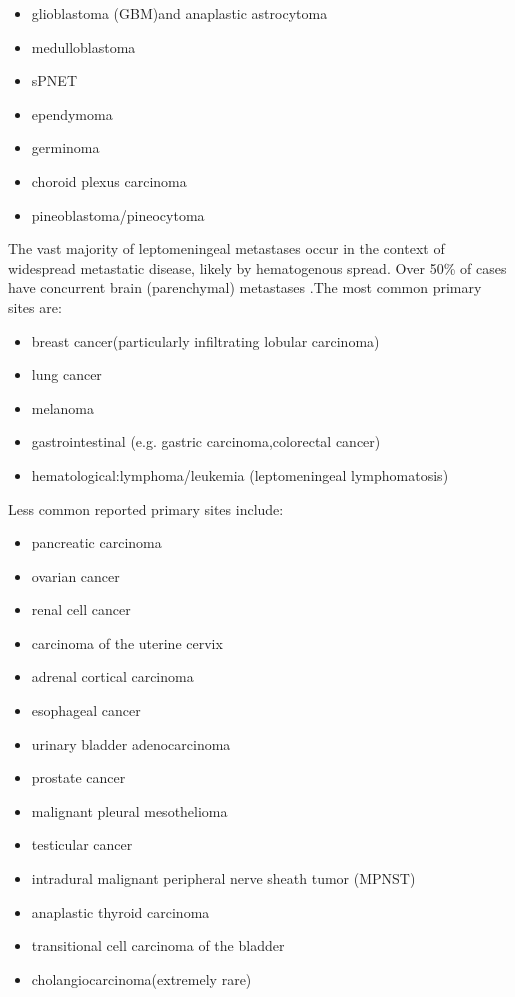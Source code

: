 \begin{itemize}
	\item
	glioblastoma (GBM)and anaplastic astrocytoma
	\item
	medulloblastoma
	\item
	sPNET
	\item
	ependymoma
	\item
	germinoma
	\item
	choroid plexus carcinoma
	\item
	pineoblastoma/pineocytoma 
\end{itemize}

The vast majority of leptomeningeal metastases occur in the context of widespread metastatic disease, likely by hematogenous spread. Over 50\% of cases have concurrent brain (parenchymal) metastases .The most common primary sites are:

\begin{itemize}
	\item
	breast cancer(particularly infiltrating lobular carcinoma)
	\item
	lung cancer
	\item
	melanoma
	\item
	gastrointestinal (e.g. gastric carcinoma,colorectal cancer)
	\item
	hematological:lymphoma/leukemia (leptomeningeal lymphomatosis)
\end{itemize}

Less common reported primary sites include:

\begin{itemize}
	\item
	pancreatic carcinoma 
	\item
	ovarian cancer 
	\item
	renal cell cancer 
	\item
	carcinoma of the uterine cervix 
	\item
	adrenal cortical carcinoma 
	\item
	esophageal cancer 
	\item
	urinary bladder adenocarcinoma 
	\item
	prostate cancer 
	\item
	malignant pleural mesothelioma 
	\item
	testicular cancer 
	\item
	intradural malignant peripheral nerve sheath tumor (MPNST) 
	\item
	anaplastic thyroid carcinoma 
	\item
	transitional cell carcinoma of the bladder 
	\item
	cholangiocarcinoma(extremely rare)
\end{itemize}

